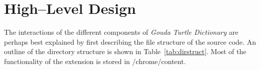 \documentclass{article}
\begin{document}
\FloatBarrier
\section{High--Level Design}

The interactions of the different components of \emph{Gouda Turtle Dictionary} are
perhaps best explained by first describing the file structure of the source
code. An outline of the directory structure is shown in
Table~\ref{tab:dirstruct}. Most of the functionality of the extension is
stored in /chrome/content.

\begin{table}[h!]
\centering
\caption{Directory Structure}
\label{tab:dirstruct}
\end{table}
\end{document}
